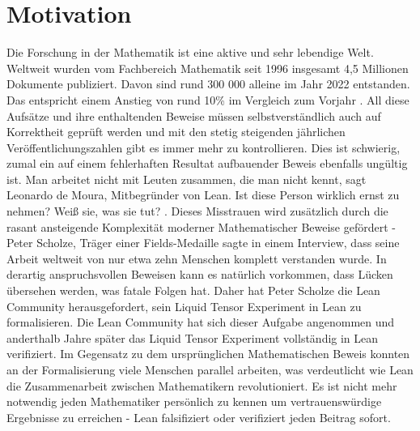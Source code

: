 \documentclass[10pt]{article}
\begin{document}
\section{Motivation} %
Die Forschung in der Mathematik ist eine aktive und sehr lebendige Welt. Weltweit wurden vom Fachbereich Mathematik seit 1996 insgesamt 4,5 Millionen Dokumente publiziert. Davon sind rund 300 000 alleine im Jahr 2022 entstanden. Das entspricht einem Anstieg von rund 10\% im Vergleich zum Vorjahr \cite{Q1}. All diese Aufsätze und ihre enthaltenden Beweise müssen selbstverständlich auch auf Korrektheit geprüft werden und mit den stetig steigenden jährlichen Veröffentlichungszahlen gibt es immer mehr zu kontrollieren. Dies ist schwierig, zumal ein auf einem fehlerhaften Resultat aufbauender Beweis ebenfalls ungültig ist. \glqq Man arbeitet nicht mit Leuten zusammen, die man nicht kennt\grqq, sagt Leonardo de Moura, Mitbegründer von Lean. \glqq Ist diese Person wirklich ernst zu nehmen? Weiß sie, was sie tut? \grqq. Dieses Misstrauen wird zusätzlich durch die rasant ansteigende Komplexität moderner Mathematischer Beweise gefördert - Peter Scholze, Träger einer Fields-Medaille sagte in einem Interview, %
dass seine Arbeit weltweit von nur etwa zehn Menschen komplett verstanden wurde. In derartig anspruchsvollen Beweisen kann es natürlich vorkommen, dass Lücken übersehen werden, was fatale Folgen hat. Daher hat Peter Scholze die Lean Community herausgefordert, sein Liquid Tensor Experiment in Lean zu formalisieren. %
Die Lean Community hat sich dieser Aufgabe angenommen und anderthalb Jahre später das Liquid Tensor Experiment vollständig in Lean verifiziert. %
Im Gegensatz zu dem ursprünglichen Mathematischen Beweis konnten an der Formalisierung viele Menschen parallel arbeiten, was verdeutlicht wie Lean die Zusammenarbeit zwischen Mathematikern revolutioniert. Es ist nicht mehr notwendig jeden Mathematiker persönlich zu kennen um vertrauenswürdige Ergebnisse zu erreichen - Lean falsifiziert oder verifiziert jeden Beitrag sofort.
\end{document}
